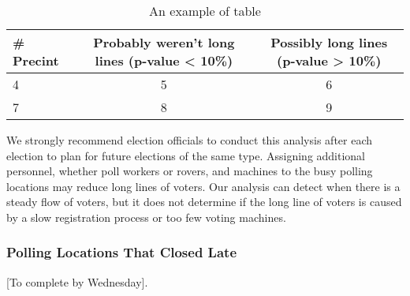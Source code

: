 \begin{table}
    \begin{center}
    \begin{tabular}{| l | c | c |}
    \hline                       
    \# Precint & Probably weren't long lines (p-value < 10\%) & Possibly long lines (p-value > 10\%) \\
    \hline
    4 & 5 & 6 \\
    \hline
    7 & 8 & 9 \\
    \hline  
    \end{tabular}
    \end{center}
    \caption{An example of table}
    \label{my_table}
\end{table}

We strongly recommend election officials to conduct this analysis after each election to plan for future elections of the same type. Assigning additional personnel, whether poll workers or rovers, and machines to the busy polling locations may reduce long lines of voters.  Our analysis can detect when there is a steady flow of voters, but it does not determine if the long line of voters is caused by a slow registration process or too few voting machines.

\subsubsection{Polling Locations That Closed Late}
[To complete by Wednesday].
